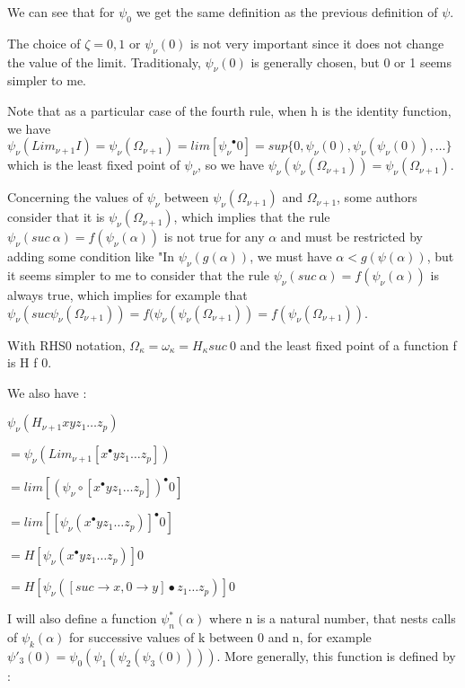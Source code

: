 \documentclass[10pt]{article}
\begin{document}
We can see that for \( \psi_0 \) we get the same definition as the previous definition of \( \psi \).

The choice of \( \zeta = 0, 1 \) or \( \psi_\nu(0) \) is not very important since it does not change the value of the limit. Traditionaly, \( \psi_\nu(0) \) is generally chosen, but 0 or 1 seems simpler to me.

Note that as a particular case of the fourth rule, when h is the identity function, we have \( \psi_\nu(Lim_{\nu+1} I) = \psi_\nu(\Omega_{\nu+1}) = lim [ {\psi_\nu}^\bullet 0 ] = sup \lbrace 0, \psi_\nu(0), \psi_\nu(\psi_\nu(0)), \ldots \rbrace \) which is the least fixed point of \( \psi_\nu \), so we have \( \psi_\nu(\psi_\nu(\Omega_{\nu+1})) = \psi_\nu(\Omega_{\nu+1}) \).

Concerning the values of \( \psi_\nu \) between \( \psi_\nu(\Omega_{\nu+1}) \) and \( \Omega_{\nu+1} \), some authors consider that it is \( \psi_\nu(\Omega_{\nu+1}) \), which implies that the rule \( \psi_\nu(suc\ \alpha) = f(\psi_\nu(\alpha)) \) is not true for any \( \alpha \) and must be restricted by adding some condition like "In \( \psi_\nu(g(\alpha)) \), we must have \( \alpha < g(\psi(\alpha)) \), but it seems simpler to me to consider that the rule \( \psi_\nu(suc\ \alpha) = f(\psi_\nu(\alpha)) \) is always true, which implies for example that \( \psi_\nu(suc \psi_\nu(\Omega_{\nu+1})) = f(\psi_\nu(\psi_\nu(\Omega_{\nu+1})) = f(\psi_\nu(\Omega_{\nu+1})) \).

\bigskip

With RHS0 notation, \( \Omega_\kappa = \omega_\kappa = H_\kappa suc\ 0 \) and the least fixed point of a function f is H f 0.

We also have :

\( \psi_\nu (H_{\nu+1} x y z_1 \ldots z_p) \)

\( = \psi_\nu (Lim_{\nu+1} [x^\bullet y z_1 \ldots z_p]) \)

\( = lim [(\psi_\nu \circ [x^\bullet y z_1 \ldots z_p])^\bullet 0] \)

\( = lim [[\psi_\nu (x^\bullet y z_1 \ldots z_p)]^\bullet 0] \)

\( = H [\psi_\nu (x^\bullet y z_1 \ldots z_p)] 0 \)

\( = H [\psi_\nu ([suc \rightarrow x, 0 \rightarrow y] \bullet z_1 \ldots z_p)] 0 \) 

\bigskip


I will also define a function \( \psi^*_n(\alpha) \) where n is a natural number, that nests calls of \( \psi_k(\alpha) \) for successive values of k between 0 and n, for example \( \psi'_3(0) = \psi_0(\psi_1(\psi_2(\psi_3(0)))) \). More generally, this function is defined by :
\end{document}
